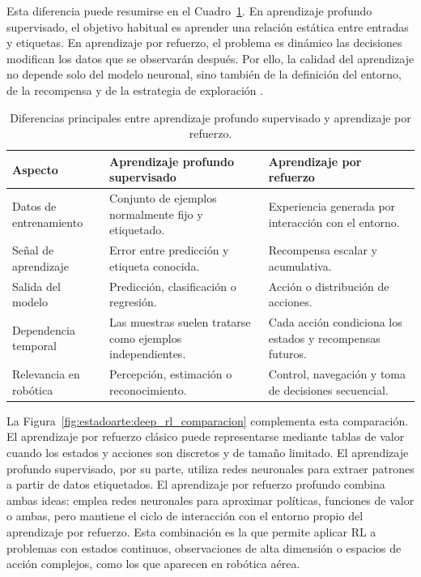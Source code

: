 Esta diferencia puede resumirse en el Cuadro~\ref{tab:estadoarte:dl_vs_rl}. En
aprendizaje profundo supervisado, el objetivo habitual es aprender una relación
estática entre entradas y etiquetas. En aprendizaje por refuerzo, el problema es
dinámico las decisiones modifican los datos que se observarán después. Por ello,
la calidad del aprendizaje no depende solo del modelo neuronal, sino también de la
definición del entorno, de la recompensa y de la estrategia de exploración
\cite{sutton2018reinforcement,molina2025rl_intro}.

\begin{table}[H]
\centering
\small
\setlength{\tabcolsep}{4pt}
\renewcommand{\arraystretch}{1.15}
\begin{tabular}{p{} p{} p{}}
\hline
\textbf{Aspecto} & \textbf{Aprendizaje profundo supervisado} & \textbf{Aprendizaje por refuerzo} \\
\hline
Datos de entrenamiento & Conjunto de ejemplos normalmente fijo y etiquetado. & Experiencia generada por interacción con el entorno. \\
Señal de aprendizaje & Error entre predicción y etiqueta conocida. & Recompensa escalar y acumulativa. \\
Salida del modelo & Predicción, clasificación o regresión. & Acción o distribución de acciones. \\
Dependencia temporal & Las muestras suelen tratarse como ejemplos independientes. & Cada acción condiciona los estados y recompensas futuros. \\
Relevancia en robótica & Percepción, estimación o reconocimiento. & Control, navegación y toma de decisiones secuencial. \\
\hline
\end{tabular}
\caption{Diferencias principales entre aprendizaje profundo supervisado y aprendizaje por refuerzo.}
\label{tab:estadoarte:dl_vs_rl}
\end{table}

La Figura~\ref{fig:estadoarte:deep_rl_comparacion} complementa esta comparación.
El aprendizaje por refuerzo clásico puede representarse mediante tablas de valor
cuando los estados y acciones son discretos y de tamaño limitado. El aprendizaje
profundo supervisado, por su parte, utiliza redes neuronales para extraer patrones
a partir de datos etiquetados. El aprendizaje por refuerzo profundo combina ambas
ideas: emplea redes neuronales para aproximar políticas, funciones de valor o ambas,
pero mantiene el ciclo de interacción con el entorno propio del aprendizaje por
refuerzo. Esta combinación es la que permite aplicar RL a problemas con estados
continuos, observaciones de alta dimensión o espacios de acción complejos, como los
que aparecen en robótica aérea.

